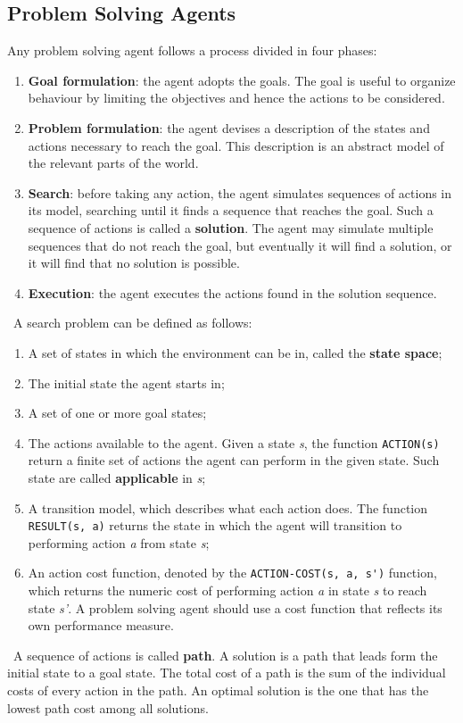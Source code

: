 \documentclass{article}
\begin{document}
\subsection{Problem Solving Agents}
Any problem solving agent follows a process divided in four phases:
\begin{enumerate}
    \item \textbf{Goal formulation}: the agent adopts the goals. The goal is useful to organize behaviour by limiting the objectives and hence the actions to be considered.
    \item \textbf{Problem formulation}: the agent devises a description of the states and actions necessary to reach the goal. This description is an abstract model of the relevant parts of the world.
    \item \textbf{Search}: before taking any action, the agent simulates sequences of actions in its model, searching until it finds a sequence that reaches the goal. Such a sequence of actions is called a \textbf{solution}. The agent may simulate multiple sequences that do not reach the goal, but eventually it will find a solution, or it will find that no solution is possible.
    \item \textbf{Execution}: the agent executes the actions found in the solution sequence.
\end{enumerate}
\
A search problem can be defined as follows:
\begin{enumerate}
    \item A set of states in which the environment can be in, called the \textbf{state space};
    \item The initial state the agent starts in;
    \item A set of one or more goal states;
    \item The actions available to the agent. Given a state \textit{s}, the function \lstinline{ACTION(s)} return a finite set of actions the agent can perform in the given state. Such state are called \textbf{applicable} in \textit{s};
    \item A transition model, which describes what each action does. The function \lstinline{RESULT(s, a)} returns the state in which the agent will transition to performing action \textit{a} from state \textit{s};
    \item An action cost function, denoted by the \lstinline{ACTION-COST(s, a, s')} function, which returns the numeric cost of performing action \textit{a} in state \textit{s} to reach state \textit{s'}. A problem solving agent should use a cost function that reflects its own performance measure.
\end{enumerate}
\
A sequence of actions is called \textbf{path}. A solution is a path that leads form the initial state to a goal state. The total cost of a path is the sum of the individual costs of every action in the path. An optimal solution is the one that has the lowest path cost among all solutions.
\end{document}
